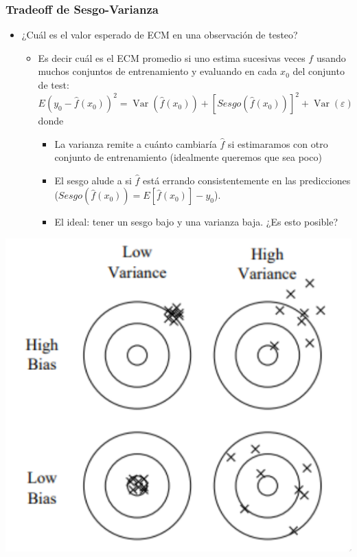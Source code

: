 \documentclass[leqno, 10pt, envcountsect]{beamer}
\numberwithin{equation}{section}
\theoremstyle{definition}
\theoremstyle{example}
\numberwithin{figure}{section}
\numberwithin{table}{section}
\let\olditem\item
\renewcommand{\item}{%
\olditem\vspace{1pt}}
\DeclareMathOperator{\var}{\mathrm{Var}}
\begin{document}
\begin{frame}
  \frametitle{Tradeoff de Sesgo-Varianza}
  \begin{itemize}
    \item ¿Cuál es el valor esperado de ECM en una observación de testeo?
      \begin{itemize}
        \item Es decir cuál es el ECM promedio si uno estima sucesivas veces
          $f$ usando muchos conjuntos de entrenamiento y evaluando en cada $x_{0}$
            del conjunto de test:
      \begin{equation*}
        E(y_{0} - \hat{f}(x_{0}))^{2} = \var(\hat{f}(x_{0})) +
        \left[Sesgo(\hat{f}(x_{0}))\right]^{2} + \var(\varepsilon)
      \end{equation*}
      donde
      \begin{itemize}
        \item La varianza remite a cuánto cambiaría $\hat{f}$ si estimaramos
          con otro conjunto de entrenamiento (idealmente queremos que sea
          poco)
        \item El sesgo alude a si $\hat{f}$ está errando consistentemente en
          las predicciones ($Sesgo(\hat{f}(x_{0})) = E[\hat{f}(x_{0})] -
          y_{0}$).
        \item El ideal: tener un sesgo bajo y una varianza baja. ¿Es esto
          posible?
      \end{itemize}
  \end{itemize}
  \end{itemize}
  \begin{center}
    \includegraphics[scale=0.2]{bias_variance_tradeoff.png}
  \end{center}
\end{frame}
\end{document}
